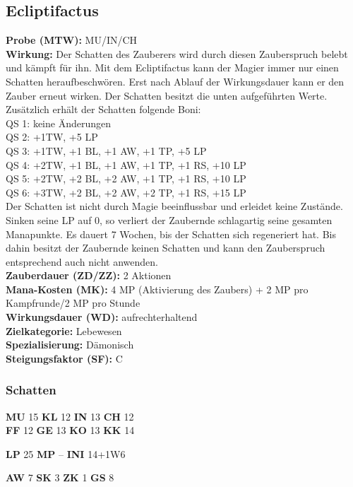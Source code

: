 \subsection{Ecliptifactus}
\label{chap:ecliptifactus}
\textbf{Probe (MTW):} MU/IN/CH \\
\textbf{Wirkung:} Der Schatten des Zauberers wird durch diesen Zauberspruch belebt und kämpft für ihn. Mit dem Ecliptifactus kann der Magier immer nur einen Schatten heraufbeschwören. Erst nach Ablauf der Wirkungsdauer kann er den Zauber erneut wirken. Der Schatten besitzt die unten aufgeführten Werte. Zusätzlich erhält der Schatten folgende Boni:\\
QS 1: keine Änderungen\\
QS 2: +1TW, +5 LP\\
QS 3: +1TW, +1 BL, +1 AW, +1 TP, +5 LP\\
QS 4: +2TW, +1 BL, +1 AW, +1 TP, +1 RS, +10 LP\\
QS 5: +2TW, +2 BL, +2 AW, +1 TP, +1 RS, +10 LP\\
QS 6: +3TW, +2 BL, +2 AW, +2 TP, +1 RS, +15 LP\\
Der Schatten ist nicht durch Magie beeinflussbar und erleidet keine Zustände. Sinken seine LP auf 0, so verliert der Zaubernde schlagartig seine gesamten Manapunkte. Es dauert 7 Wochen, bis der Schatten sich regeneriert hat. Bis dahin besitzt der Zaubernde keinen Schatten und kann den Zauberspruch entsprechend auch nicht anwenden. \\
\textbf{Zauberdauer (ZD/ZZ):} 2 Aktionen \\
\textbf{Mana-Kosten (MK):} 4 MP (Aktivierung des Zaubers) + 2 MP pro Kampfrunde/2 MP pro Stunde \\
\textbf{Wirkungsdauer (WD):} aufrechterhaltend \\
\textbf{Zielkategorie:} Lebewesen \\
\textbf{Spezialisierung:} Dämonisch \\
\textbf{Steigungsfaktor (SF):} C

\subsubsection{Schatten}

\textbf{MU} 15 \textbf{KL} 12 \textbf{IN} 13 \textbf{CH} 12 \\
\textbf{FF} 12 \textbf{GE} 13 \textbf{KO} 13 \textbf{KK} 14

\textbf{LP} 25 \textbf{MP} – \textbf{INI} 14+1W6

\textbf{AW} 7 \textbf{SK} 3 \textbf{ZK} 1 \textbf{GS} 8

